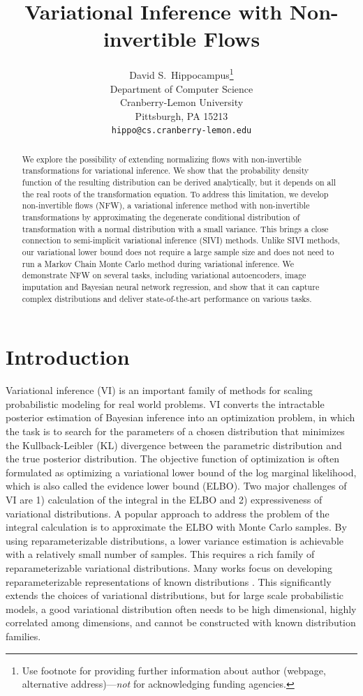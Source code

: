 \documentclass{article}
\title{Variational Inference with Non-invertible Flows}
\author{%
  David S.~Hippocampus\thanks{Use footnote for providing further information
    about author (webpage, alternative address)---\emph{not} for acknowledging
    funding agencies.} \\
  Department of Computer Science\\
  Cranberry-Lemon University\\
  Pittsburgh, PA 15213 \\
  \texttt{hippo@cs.cranberry-lemon.edu} \\
}
\begin{document}

\maketitle

\begin{abstract}
We explore the possibility of extending normalizing flows with non-invertible transformations for variational inference. We show that the probability density function of the resulting distribution can be derived analytically, but it depends on all the real roots of the transformation equation.  To address this limitation, we develop non-invertible flows (NFW), a variational inference method with non-invertible transformations by approximating the degenerate conditional distribution of transformation with a normal distribution with a small variance. This brings a close connection to semi-implicit variational inference (SIVI) methods. Unlike SIVI methods, our variational lower bound does not require a large sample size and does not need to run a Markov Chain Monte Carlo method during variational inference. We demonstrate NFW on several tasks, including variational autoencoders, image imputation and Bayesian neural network regression, and show that it can capture complex distributions and deliver state-of-the-art performance on various tasks.
\end{abstract}

\section{Introduction}

Variational inference (VI) is an important family of methods for scaling probabilistic modeling for real world problems. VI converts the intractable posterior estimation of Bayesian inference into an optimization problem, in which the task is to search for the parameters of a chosen distribution that minimizes the Kullback-Leibler (KL) divergence between the parametric distribution and the true posterior distribution. The objective function of optimization is often formulated as optimizing a variational lower bound of the log marginal likelihood, which is also called the evidence lower bound (ELBO). Two major challenges of VI are 1) calculation of the integral in the ELBO and 2) expressiveness of variational distributions. 
A popular approach to address the problem of the integral calculation is to approximate the ELBO with Monte Carlo samples. By using reparameterizable distributions, a lower variance estimation is achievable with a relatively small number of samples. This requires a rich family of reparameterizable variational distributions. Many works focus on developing reparameterizable representations of known distributions \citep{RuizEtAl2016,NaessethEtAl2016,FigurnovEtAl2018}. This significantly extends the choices of variational distributions, but for large scale probabilistic models, a good variational distribution often needs to be  high dimensional, highly correlated among dimensions, and cannot be constructed with known distribution families. 
\end{document}
